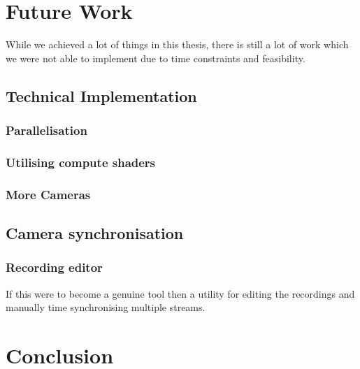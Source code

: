 \section{Future Work}

While we achieved a lot of things in this thesis, there is still a lot of work which we were not able to implement due to time constraints and feasibility.

\subsection{Technical Implementation}

\subsubsection{Parallelisation}

\subsubsection{Utilising compute shaders}

\subsubsection{More Cameras}

\subsection{Camera synchronisation}

\subsubsection{Recording editor}

If this were to become a genuine tool then a utility for editing the recordings and manually time synchronising multiple streams.

\section{Conclusion}

